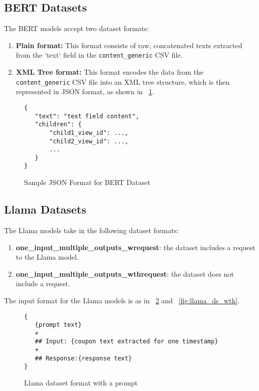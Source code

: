 \documentclass[licencjacka,en]{pracamgr}
\begin{document}
\subsection{BERT Datasets}
The BERT models accept two dataset formats:

\begin{enumerate}
    \item \textbf{Plain format:} This format consists of raw, concatenated texts extracted from the `text` field in the \texttt{content\_generic} CSV file.
    \item \textbf{XML Tree format:} This format encodes the data from the \texttt{content\_generic} CSV file into an XML tree structure, which is then represented in JSON format, as shown in ~\ref{fig:json_example_xml_tree}.
\end{enumerate}



\begin{figure}[h]
\centering
\begin{tcolorbox}[sharp corners, boxrule=0.5mm, colframe=black, colback=white, coltitle=black, width=0.9\textwidth]
\begin{BVerbatim}
{
   "text": "text field content",
   "children": {
       "child1_view_id": ...,
       "child2_view_id": ...,
       ...
   }
}
\end{BVerbatim}
\end{tcolorbox}
\caption{Sample JSON Format for BERT Dataset}
\label{fig:json_example_xml_tree}
\end{figure}

\subsection{Llama Datasets}
The Llama models take in the following dataset formats:

\begin{enumerate}
    \item \textbf{one\_input\_multiple\_outputs\_wrequest}: the dataset includes a request to the Llama model.
    \item \textbf{one\_input\_multiple\_outputs\_wthrequest}: the dataset does not include a request.
\end{enumerate}

The input format for the Llama models is as in ~\ref{fig:llama_ds_w} and ~\ref{fig:llama_ds_wth}.

\begin{figure}[h]
\centering
\begin{tcolorbox}[sharp corners, boxrule=0.5mm, colframe=black, colback=white, coltitle=black, width=0.9\textwidth]
\begin{BVerbatim}
{
   {prompt text}
   +
   ## Input: {coupon text extracted for one timestamp}
   +
   ## Response:{response text}
}
\end{BVerbatim}
\end{tcolorbox}
\caption{Llama dataset format with a prompt}
\label{fig:llama_ds_w}
\end{figure}
\end{document}

